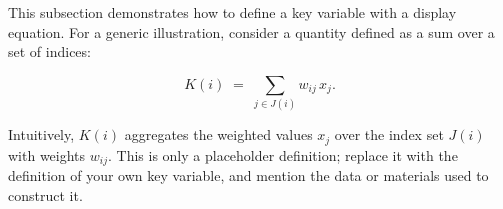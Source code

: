 
This subsection demonstrates how to define a key variable with a display
equation. For a generic illustration, consider a quantity defined as a sum
over a set of indices:

\begin{equation}
K(i) \;=\; \sum_{j \in J(i)} w_{ij} \, x_j .
\label{eq:example-3}
\end{equation}

Intuitively, $K(i)$ aggregates the weighted values $x_j$ over the index set
$J(i)$ with weights $w_{ij}$. This is only a placeholder definition; replace
it with the definition of your own key variable, and mention the data or
materials used to construct it.
